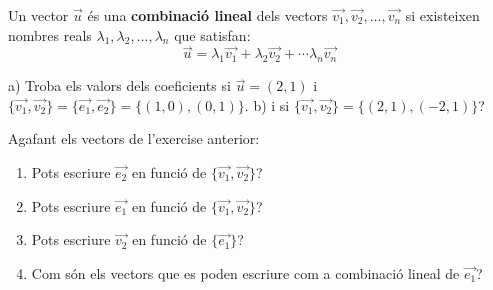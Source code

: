 \documentclass{beamer}
\begin{document}
\begin{frame}
  \begin{definicio}
    Un vector $\vec{u}$ és una {\bf combinació lineal} dels vectors $\overrightarrow{v_1},\overrightarrow{v_2}, \ldots , \overrightarrow{v_n}$ si existeixen nombres reals $\lambda_1, \lambda_2, \ldots, \lambda_n$ que satisfan:
    \[\vec{u} = \lambda_1 \overrightarrow{v_1} + \lambda_2 \overrightarrow{v_2} + \cdots \lambda_n \overrightarrow{v_n}\]
  \end{definicio}

\begin{exercise}{}{}
  a) Troba els valors dels coeficients si $\vec{u}=(2,1)$ i $\{\overrightarrow{v_1},\overrightarrow{v_2}\} = \{\overrightarrow{e_1},\overrightarrow{e_2}\} = \{ (1,0),(0,1) \}$. b) i si $\{\overrightarrow{v_1},\overrightarrow{v_2}\} = \{ (2,1),(-2,1) \}$?
\end{exercise}

  \begin{exercise}{}{}
    Agafant els vectors de l'exercise anterior:
    \begin{enumerate}
      \item Pots escriure $\overrightarrow{e_2}$ en funció de $\{\overrightarrow{v_1},\overrightarrow{v_2}\}$?
      \item Pots escriure $\overrightarrow{e_1}$ en funció de $\{\overrightarrow{v_1},\overrightarrow{v_2}\}$?
      \item Pots escriure $\overrightarrow{v_2}$ en funció de $\{\overrightarrow{e_1}\}$?
      \item Com són els vectors que es poden escriure com a combinació lineal de $\overrightarrow{e_1}$?
    \end{enumerate}
  \end{exercise}
\end{frame}
\end{document}
